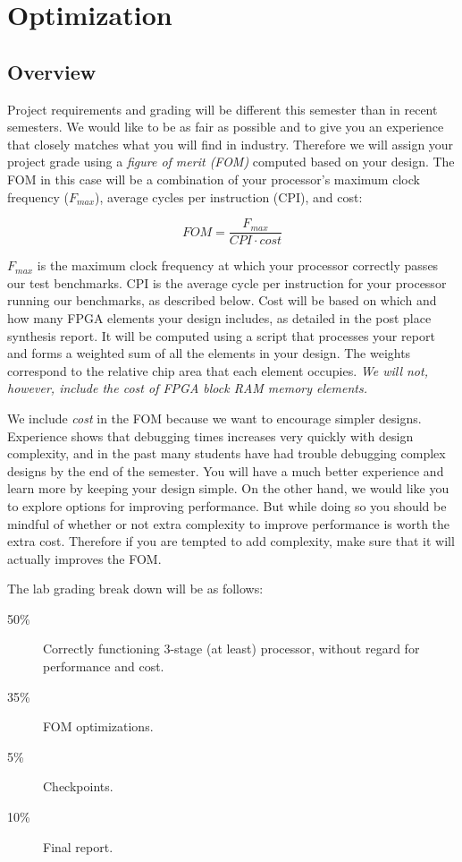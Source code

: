 \section{Optimization}
\subsection{Overview}
Project requirements and grading will be different this semester than in recent semesters.
We would like to be as fair as possible and to give you an experience that closely matches what you will find in industry.
Therefore we will assign your project grade using a {\em figure of merit (FOM)} computed based on your design.
The FOM in this case will be a combination of your processor's maximum clock frequency ($F_{max}$), average cycles per instruction (CPI), and cost:

$$ FOM = \frac{F_{max}}{CPI \cdot cost}$$


$F_{max}$ is the maximum clock frequency at which your processor correctly passes our test benchmarks.
CPI is the average cycle per instruction for your processor running our benchmarks, as described below.
Cost will be based on which and how many FPGA elements your design includes, as detailed in the post place synthesis report.
It will be computed using a script that processes your report and forms a weighted sum of all the elements in your design.
The weights correspond to the relative chip area that each element occupies.  {\em We will not, however, include the cost of FPGA block RAM memory elements.}

We include {\em cost} in the FOM because we want to encourage simpler designs.
Experience shows that debugging times increases very quickly with design complexity, and in the past many students
have had trouble debugging complex designs by the end of the semester.
You will have a much better experience and learn more by keeping your design simple.
On the other hand, we would like you to explore options for improving performance.
But while doing so you should be mindful of whether or not extra complexity to improve performance is worth the extra cost.
Therefore if you are tempted to add complexity, make sure that it will actually improves the FOM.

The lab grading break down will be as follows:
\begin{description}
\item[50\%] Correctly functioning 3-stage (at least) processor, without regard for performance and cost.
\item[35\%] FOM optimizations.
\item[5\%] Checkpoints.
\item[10\%] Final report.
\end{description}

